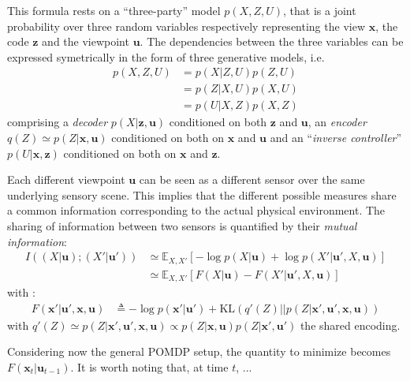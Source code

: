 \documentclass[12pt,twoside,openright]{article}
\begin{document}
This formula rests on a ``three-party'' model $p(X, Z, U)$, that is a joint probability over three random variables respectively representing the view $\boldsymbol{x}$, the code $\boldsymbol{z}$ and the viewpoint  $\boldsymbol{u}$. The dependencies between the three variables can be expressed symetrically in the form of three generative models, i.e. 
\begin{align}
p(X, Z, U) &= p(X| Z, U) p(Z,U)\nonumber\\ 
&= p(Z| X, U)p(X, U)\nonumber\\
&= p(U|X, Z)p(X, Z)\nonumber
\end{align}
comprising a \emph{decoder} $p(X|\boldsymbol{z}, \boldsymbol{u})$ 
conditioned on both $\boldsymbol{z}$ and $\boldsymbol{u}$,  an \emph{encoder} $q(Z) \simeq p(Z|\boldsymbol{x}, \boldsymbol{u})$  conditioned on both on  $\boldsymbol{x}$ and $\boldsymbol{u}$ and an ``\emph{inverse controller}'' $p(U|\boldsymbol{x}, \boldsymbol{z})$ conditioned on both on  $\boldsymbol{x}$ and $\boldsymbol{z}$.

Each different viewpoint $\boldsymbol{u}$ can be seen as a different sensor over the same underlying sensory scene. This implies that the different possible measures share a common information corresponding to the actual physical environment. The sharing of information between two sensors is quantified by their \emph{mutual information}:
\begin{align}
I((X| \boldsymbol{u}); (X'| \boldsymbol{u}')) &\simeq \mathbb{E}_{X,X'} \left[-\log p(X| \boldsymbol{u}) + \log p(X'| \boldsymbol{u}', X, \boldsymbol{u})\right] \nonumber\\
&\simeq \mathbb{E}_{X,X'} \left[F(X|\boldsymbol{u}) - F(X'|\boldsymbol{u}', X, \boldsymbol{u})\right] 
\end{align}
with :
\begin{align}
F(\boldsymbol{x}'|\boldsymbol{u}', \boldsymbol{x}, \boldsymbol{u}) 
&\triangleq - \log p(\boldsymbol{x}'|\boldsymbol{u}') + \text{KL}(q'(Z)||p(Z|\boldsymbol{x}',\boldsymbol{u}', \boldsymbol{x}, \boldsymbol{u}))
\label{eq:FEP-uxu}
\end{align}
with $q'(Z) \simeq p(Z|\boldsymbol{x}', \boldsymbol{u}', \boldsymbol{x}, \boldsymbol{u})\propto 
p(Z|\boldsymbol{x}, \boldsymbol{u})p(Z|\boldsymbol{x}', \boldsymbol{u}')$ the shared encoding.




{\color{blue} Considering now the general POMDP setup, the quantity to minimize becomes $F(\boldsymbol{x}_t|\boldsymbol{u}_{t-1})$. 
It is worth noting that, at time $t$, ...}
\end{document}
